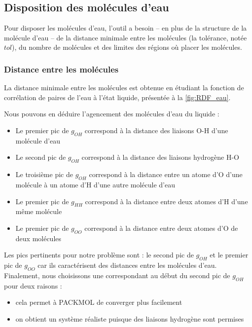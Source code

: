 \documentclass[11pt, a4paper]{article}
\def\ce#1{#1}%
\begin{document}
	\subsection{Disposition des molécules d'eau}

Pour disposer les molécules d'eau, l'outil a besoin -- en plus de la structure de la molécule d'eau -- de la distance minimale entre les molécules (la tolérance, notée $tol$), du nombre de molécules et des limites des régions où placer les molécules.

		\subsubsection{Distance entre les molécules}

La distance minimale entre les molécules est obtenue en étudiant la fonction de corrélation de paires de l'eau à l'état liquide, présentée à la \autoref{fig:RDF_eau}.

Nous pouvons en déduire l'agencement des molécules d'eau du liquide :
\begin{itemize}
	\item Le premier pic de $g_{\ce{OH}}$ correspond à la distance des liaisons \ce{O-H} d'une molécule d'eau
	\item Le second pic de $g_{\ce{OH}}$ correspond à la distance des liaisons hydrogène \ce{H-O}
	\item Le troisième pic de $g_{\ce{OH}}$ correspond à la distance entre un atome d'\ce{O} d'une molécule à un atome d'\ce{H} d'une autre molécule d'eau
	\item Le premier pic de $g_{\ce{HH}}$ correspond à la distance entre deux atomes d'\ce{H} d'une même molécule
	\item Le premier pic de $g_{\ce{OO}}$ correspond à la distance entre deux atomes d'\ce{O} de deux molécules
\end{itemize}

Les pics pertinents pour notre problème sont : le second pic de $g_{\ce{OH}}$ et le premier pic de $g_{\ce{OO}}$ car ils caractérisent des distances entre les molécules d'eau.\\
Finalement, nous choisissons une  correspondant au début du second pic de $g_{\ce{OH}}$ pour deux raisons :
\begin{itemize}
	\item cela permet à PACKMOL de converger plus facilement
	\item on obtient un système réaliste puisque des liaisons hydrogène sont permises
\end{itemize}
\end{document}
